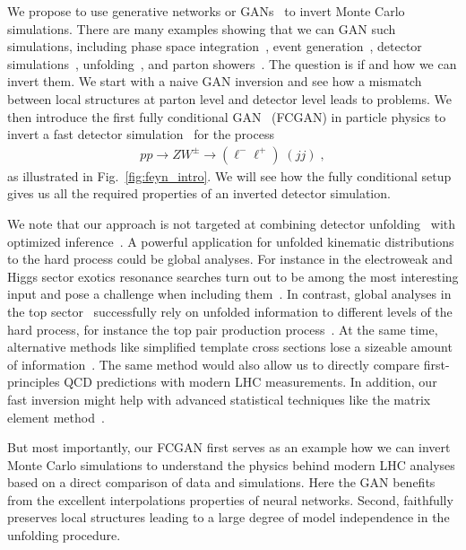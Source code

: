 We propose to use generative networks or GANs~\cite{goodfellow} to
invert Monte Carlo simulations. There are many examples showing that
we can GAN such simulations, including phase space
integration~\cite{maxim,bendavid}, event
generation~\cite{dutch,gan_datasets,DijetGAN2, gan_phasespace},
detector
simulations~\cite{calogan1,calogan2,fast_accurate,aachen_wgan1,aachen_wgan2,ATLASShowerGAN,ATLASsimGAN},
unfolding~\cite{Datta:2018mwd}, and parton
showers~\cite{shower,by_example,monkshower,juniprshower}. The
question is if and how we can invert them.  We start with a naive GAN
inversion and see how a mismatch between local structures at parton
level and detector level leads to problems.  We then introduce the
first fully conditional GAN~\cite{cond_gan} (FCGAN) in particle
physics to invert a fast detector simulation~\cite{delphes} for the
process
%
\begin{align}
pp
\to ZW^\pm
\to (\ell^- \ell^+) \; (j j ) \; ,
\end{align}
%
as illustrated in Fig.~\ref{fig:feyn_intro}.  We will see how the
fully conditional setup gives us all the required properties of an
inverted detector simulation.

We note that our approach is not targeted at combining detector
unfolding~\cite{Cowan:2002in,Blobel:2011fih,Balasubramanian:2019itp}
with optimized inference~\cite{madminer,madminer_tool,Andreassen:2019cjw}.  A
powerful application for unfolded kinematic distributions to the hard
process could be global analyses. For instance in the electroweak and
Higgs sector exotics resonance searches turn out to be among the most
interesting input and pose a challenge when including
them~\cite{Biekotter:2018rhp}. In contrast, global analyses in the top
sector~\cite{Brivio:2019ius,Hartland:2019bjb,Buckley:2015lku}
successfully rely on unfolded information to different levels of the
hard process, for instance the top pair production
process~\cite{Khachatryan:2015oqa,Aad:2015mbv}. At the same time,
alternative methods like simplified template cross sections lose a
sizeable amount of information~\cite{Brehmer:2019gmn}.  The same
method would also allow us to directly compare first-principles QCD
predictions with modern LHC measurements.  In addition, our fast
inversion might help with advanced statistical techniques like the
matrix element
method~\cite{Kondo:1988yd,Martini:2015fsa,Gritsan:2016hjl,Martini:2017ydu,Kraus:2019qoq,Prestel:2019neg}.

But most importantly, our FCGAN first serves as an example how we can
invert Monte Carlo simulations to understand the physics behind modern
LHC analyses based on a direct comparison of data and
simulations. Here the GAN benefits from the excellent interpolations
properties of neural networks. Second, faithfully preserves local
structures leading to a large degree of model independence in the
unfolding procedure.

